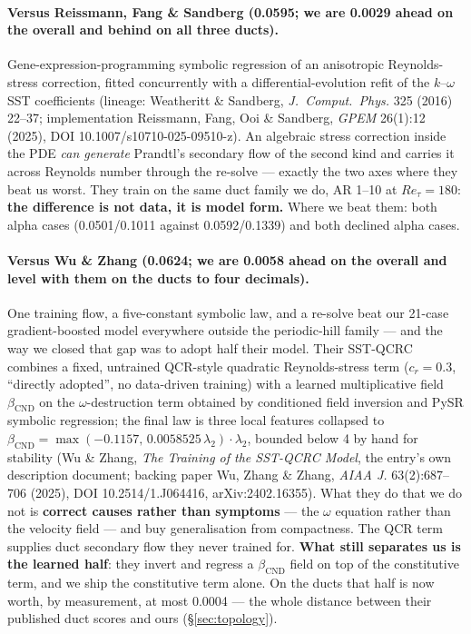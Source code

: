 \documentclass[11pt,a4paper]{article}
\newcommand{\breakus}{\textunderscore\allowbreak}
\newcommand{\code}[1]{{\small\ttfamily\let\_\breakus #1}}
\begin{document}
\paragraph{Versus Reissmann, Fang \& Sandberg (0.0595; we are 0.0029 ahead on the overall
and behind on all three ducts).} Gene-expression-programming
symbolic regression of an anisotropic Reynolds-stress correction, fitted concurrently with
a differential-evolution refit of the $k$--$\omega$ SST coefficients
(lineage: Weatheritt \& Sandberg, \emph{J.\ Comput.\ Phys.} 325 (2016) 22--37;
implementation Reissmann, Fang, Ooi \& Sandberg, \emph{GPEM} 26(1):12 (2025), DOI
10.1007/s10710-025-09510-z). An algebraic stress correction inside the PDE \emph{can
generate} Prandtl's secondary flow of the second kind and carries it across Reynolds number
through the re-solve --- exactly the two axes where they beat us worst. They train on the
same duct family we do, AR 1--10 at $Re_\tau = 180$: \textbf{the difference is not data, it
is model form.} Where we beat them: both \code{alpha\_15} cases (0.0501/0.1011 against
0.0592/0.1339) and both declined \code{alpha\_05} cases.

\paragraph{Versus Wu \& Zhang (0.0624; we are 0.0058 ahead on the overall and level with
them on the ducts to four decimals).} One training flow, a five-constant
symbolic law, and a re-solve beat our 21-case gradient-boosted model everywhere outside the
periodic-hill family --- and the way we closed that gap was to adopt half their model.
Their SST-QCRC combines a fixed, untrained QCR-style quadratic
Reynolds-stress term ($c_r = 0.3$, ``directly adopted'', no data-driven training) with a
learned multiplicative field $\beta_{\mathrm{CND}}$ on the $\omega$-destruction term
obtained by conditioned field inversion and PySR symbolic regression; the final law is three
local features collapsed to $\beta_{\mathrm{CND}} = \max(-0.1157,\,0.0058525\,\lambda_2)\cdot
\lambda_2$, bounded below 4 by hand for stability (Wu \& Zhang, \emph{The Training of the
SST-QCRC Model}, the entry's own description document; backing paper Wu, Zhang \& Zhang,
\emph{AIAA J.} 63(2):687--706 (2025), DOI 10.2514/1.J064416, arXiv:2402.16355). What they do
that we do not is \textbf{correct causes rather than symptoms} --- the $\omega$ equation
rather than the velocity field --- and buy generalisation from compactness. The QCR term
supplies duct secondary flow they never trained for. \textbf{What still separates us is the
learned half}: they invert and regress a $\beta_{\mathrm{CND}}$ field on top of the
constitutive term, and we ship the constitutive term alone. On the ducts that
half is now worth, by measurement, at most 0.0004 --- the whole distance between their
published duct scores and ours (\S\ref{sec:topology}).
\end{document}
